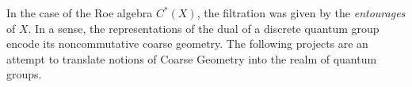 In the case of the Roe algebra $C^*(X)$, the filtration was given by the \textit{entourages} of $X$. In a sense, the representations of the dual of a discrete quantum group encode its noncommutative coarse geometry. The following projects are an attempt to translate notions of Coarse Geometry into the realm of quantum groups.       






      
